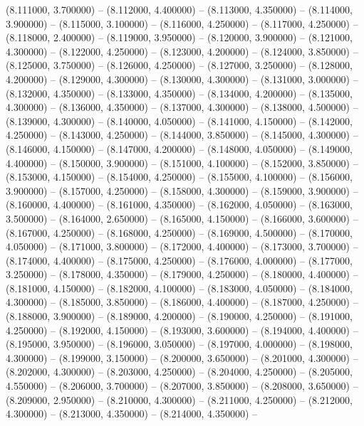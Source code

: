 (8.111000, 3.700000) -- 
(8.112000, 4.400000) -- 
(8.113000, 4.350000) -- 
(8.114000, 3.900000) -- 
(8.115000, 3.100000) -- 
(8.116000, 4.250000) -- 
(8.117000, 4.250000) -- 
(8.118000, 2.400000) -- 
(8.119000, 3.950000) -- 
(8.120000, 3.900000) -- 
(8.121000, 4.300000) -- 
(8.122000, 4.250000) -- 
(8.123000, 4.200000) -- 
(8.124000, 3.850000) -- 
(8.125000, 3.750000) -- 
(8.126000, 4.250000) -- 
(8.127000, 3.250000) -- 
(8.128000, 4.200000) -- 
(8.129000, 4.300000) -- 
(8.130000, 4.300000) -- 
(8.131000, 3.000000) -- 
(8.132000, 4.350000) -- 
(8.133000, 4.350000) -- 
(8.134000, 4.200000) -- 
(8.135000, 4.300000) -- 
(8.136000, 4.350000) -- 
(8.137000, 4.300000) -- 
(8.138000, 4.500000) -- 
(8.139000, 4.300000) -- 
(8.140000, 4.050000) -- 
(8.141000, 4.150000) -- 
(8.142000, 4.250000) -- 
(8.143000, 4.250000) -- 
(8.144000, 3.850000) -- 
(8.145000, 4.300000) -- 
(8.146000, 4.150000) -- 
(8.147000, 4.200000) -- 
(8.148000, 4.050000) -- 
(8.149000, 4.400000) -- 
(8.150000, 3.900000) -- 
(8.151000, 4.100000) -- 
(8.152000, 3.850000) -- 
(8.153000, 4.150000) -- 
(8.154000, 4.250000) -- 
(8.155000, 4.100000) -- 
(8.156000, 3.900000) -- 
(8.157000, 4.250000) -- 
(8.158000, 4.300000) -- 
(8.159000, 3.900000) -- 
(8.160000, 4.400000) -- 
(8.161000, 4.350000) -- 
(8.162000, 4.050000) -- 
(8.163000, 3.500000) -- 
(8.164000, 2.650000) -- 
(8.165000, 4.150000) -- 
(8.166000, 3.600000) -- 
(8.167000, 4.250000) -- 
(8.168000, 4.250000) -- 
(8.169000, 4.500000) -- 
(8.170000, 4.050000) -- 
(8.171000, 3.800000) -- 
(8.172000, 4.400000) -- 
(8.173000, 3.700000) -- 
(8.174000, 4.400000) -- 
(8.175000, 4.250000) -- 
(8.176000, 4.000000) -- 
(8.177000, 3.250000) -- 
(8.178000, 4.350000) -- 
(8.179000, 4.250000) -- 
(8.180000, 4.400000) -- 
(8.181000, 4.150000) -- 
(8.182000, 4.100000) -- 
(8.183000, 4.050000) -- 
(8.184000, 4.300000) -- 
(8.185000, 3.850000) -- 
(8.186000, 4.400000) -- 
(8.187000, 4.250000) -- 
(8.188000, 3.900000) -- 
(8.189000, 4.200000) -- 
(8.190000, 4.250000) -- 
(8.191000, 4.250000) -- 
(8.192000, 4.150000) -- 
(8.193000, 3.600000) -- 
(8.194000, 4.400000) -- 
(8.195000, 3.950000) -- 
(8.196000, 3.050000) -- 
(8.197000, 4.000000) -- 
(8.198000, 4.300000) -- 
(8.199000, 3.150000) -- 
(8.200000, 3.650000) -- 
(8.201000, 4.300000) -- 
(8.202000, 4.300000) -- 
(8.203000, 4.250000) -- 
(8.204000, 4.250000) -- 
(8.205000, 4.550000) -- 
(8.206000, 3.700000) -- 
(8.207000, 3.850000) -- 
(8.208000, 3.650000) -- 
(8.209000, 2.950000) -- 
(8.210000, 4.300000) -- 
(8.211000, 4.250000) -- 
(8.212000, 4.300000) -- 
(8.213000, 4.350000) -- 
(8.214000, 4.350000) -- 
